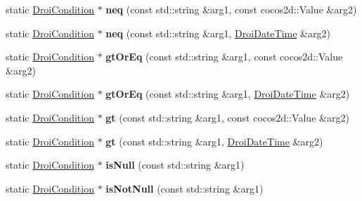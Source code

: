 \begin{DoxyCompactItemize}
\item 
\mbox{\label{class_droi_condition_aca04a2f388688774cc699db0d5b58f7f}} 
static \hyperlink{class_droi_condition}{Droi\+Condition} $\ast$ {\bfseries neq} (const std\+::string \&arg1, const cocos2d\+::\+Value \&arg2)
\item 
\mbox{\label{class_droi_condition_a9c44aafbd2b3aa30cdd72c6202b97426}} 
static \hyperlink{class_droi_condition}{Droi\+Condition} $\ast$ {\bfseries neq} (const std\+::string \&arg1, \hyperlink{class_droi_date_time}{Droi\+Date\+Time} \&arg2)
\item 
\mbox{\label{class_droi_condition_ac321f7d789bd1bb7116e82e7b1be7cfe}} 
static \hyperlink{class_droi_condition}{Droi\+Condition} $\ast$ {\bfseries gt\+Or\+Eq} (const std\+::string \&arg1, const cocos2d\+::\+Value \&arg2)
\item 
\mbox{\label{class_droi_condition_a3c917eb15bfb4225d88d0fe53238d0fb}} 
static \hyperlink{class_droi_condition}{Droi\+Condition} $\ast$ {\bfseries gt\+Or\+Eq} (const std\+::string \&arg1, \hyperlink{class_droi_date_time}{Droi\+Date\+Time} \&arg2)
\item 
\mbox{\label{class_droi_condition_a4693cf7c9444291b1d1e8037ddf38e71}} 
static \hyperlink{class_droi_condition}{Droi\+Condition} $\ast$ {\bfseries gt} (const std\+::string \&arg1, const cocos2d\+::\+Value \&arg2)
\item 
\mbox{\label{class_droi_condition_a69a6550b557be882d523a30ccfad9bbb}} 
static \hyperlink{class_droi_condition}{Droi\+Condition} $\ast$ {\bfseries gt} (const std\+::string \&arg1, \hyperlink{class_droi_date_time}{Droi\+Date\+Time} \&arg2)
\item 
\mbox{\label{class_droi_condition_a2235058d91d8d476e324773ea352e705}} 
static \hyperlink{class_droi_condition}{Droi\+Condition} $\ast$ {\bfseries is\+Null} (const std\+::string \&arg1)
\item 
\mbox{\label{class_droi_condition_a46b3d3ec741eae61ecdb7ac4f837d18f}} 
static \hyperlink{class_droi_condition}{Droi\+Condition} $\ast$ {\bfseries is\+Not\+Null} (const std\+::string \&arg1)

\end{DoxyCompactItemize}
